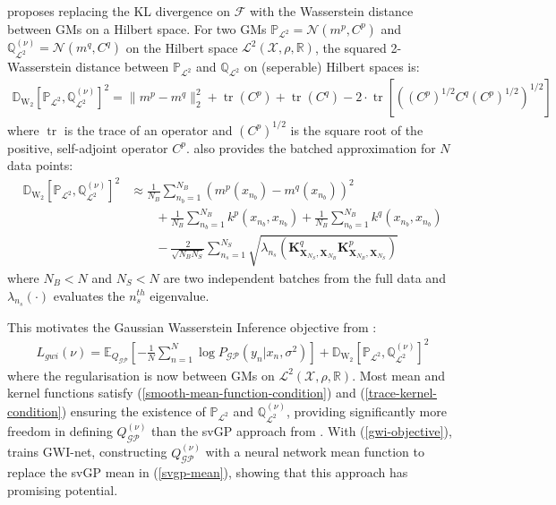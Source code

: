\documentclass{article}
\newcommand{\WD}{\operatorname{\mathbb{D}_{W_2}}}
\newcommand{\tr}{\operatorname{tr}}
\newcommand{\GP}{\operatorname{\mathcal{GP}}}
\numberwithin{equation}{section}
\begin{document}
\cite{wild2022generalized} proposes replacing the KL divergence on $\mathcal{F}$ with the Wasserstein distance between GMs on a Hilbert space. For two GMs $\mathbb{P}_{\mathcal{L}^2} = \mathcal{N}(m^p, C^p)$ and $\mathbb{Q}^{(\nu)}_{\mathcal{L}^2} = \mathcal{N}(m^q, C^q)$ on the Hilbert space $\mathcal{L}^2(\mathcal{X}, \rho, \mathbb{R})$, the squared 2-Wasserstein distance between $\mathbb{P}_{\mathcal{L}^2}$ and $\mathbb{Q}_{\mathcal{L}^2}$ on (seperable) Hilbert spaces is:
\begin{align}
    \label{wasserstein-distance}
    \WD \left[\mathbb{P}_{\mathcal{L}^2}, \mathbb{Q}^{(\nu)}_{\mathcal{L}^2}\right]^2 = \| m^p - m^q\|_2^2 + \tr(C^p) + \tr(C^q) - 2 \cdot \tr \left[ \left( \left(C^p\right)^{1/2} C^q \left(C^p\right)^{1/2}\right)^{1/2}\right]
\end{align}
where $\tr$ is the trace of an operator and $\left(C^p\right)^{1/2}$ is the square root of the positive, self-adjoint operator $C^p$. \cite{wild2022generalized} also provides the batched approximation for $N$ data points:
\begin{align}
    \WD \left[\mathbb{P}_{\mathcal{L}^2}, \mathbb{Q}^{(\nu)}_{\mathcal{L}^2}\right]^2 &\approx \frac{1}{N_B}\sum_{n_b=1}^{N_B} \left(m^p(x_{n_b}) - m^q(x_{n_b})\right)^2 \nonumber \\
    & \qquad + \frac{1}{N_B} \sum_{n_b=1}^{N_B} k^p(x_{n_b}, x_{n_b}) + \frac{1}{N_B} \sum_{n_b=1}^{N_B} k^q(x_{n_b}, x_{n_b}) \nonumber \\
    & \qquad - \frac{2}{\sqrt{N_B N_S}} \sum_{n_s=1}^{N_S} \sqrt{\lambda_{n_s}\left(\mathbf{K}^q_{\mathbf{X}_{N_S}, \mathbf{X}_{N_B}}\mathbf{K}^p_{\mathbf{X}_{N_B}, \mathbf{X}_{N_S}}\right)}
    \label{wasserstein-distance-approximation}
\end{align}
where $N_B < N$ and $N_S < N$ are two independent batches from the full data and $\lambda_{n_s}(\cdot)$ evaluates the $n_s^{th}$ eigenvalue. 

This motivates the Gaussian Wasserstein Inference objective from \cite{wild2022generalized}:
\begin{align}
    \label{gwi-objective}
    L_{gwi}(\nu) = \mathbb{E}_{Q_{\GP}}\left[- \frac{1}{N}\sum_{n=1}^N \log P_{\GP}\left(y_n \vert x_n, \sigma^2\right) \right] + \WD \left[\mathbb{P}_{\mathcal{L}^2}, \mathbb{Q}^{(\nu)}_{\mathcal{L}^2}\right]^2
\end{align}
where the regularisation is now between GMs on $\mathcal{L}^2(\mathcal{X}, \rho, \mathbb{R})$. Most mean and kernel functions satisfy (\ref{smooth-mean-function-condition}) and (\ref{trace-kernel-condition}) ensuring the existence of $\mathbb{P}_{\mathcal{L}^2}$ and $\mathbb{Q}^{(\nu)}_{\mathcal{L}^2}$, providing significantly more freedom in defining $Q^{(\nu)}_{\GP}$ than the svGP approach from \cite{titsias2009variational}. With (\ref{gwi-objective}), \cite{wild2022generalized} trains GWI-net, constructing $Q^{(\nu)}_{\GP}$ with a neural network mean function to replace the svGP mean in (\ref{svgp-mean}), showing that this approach has promising potential.
\end{document}
